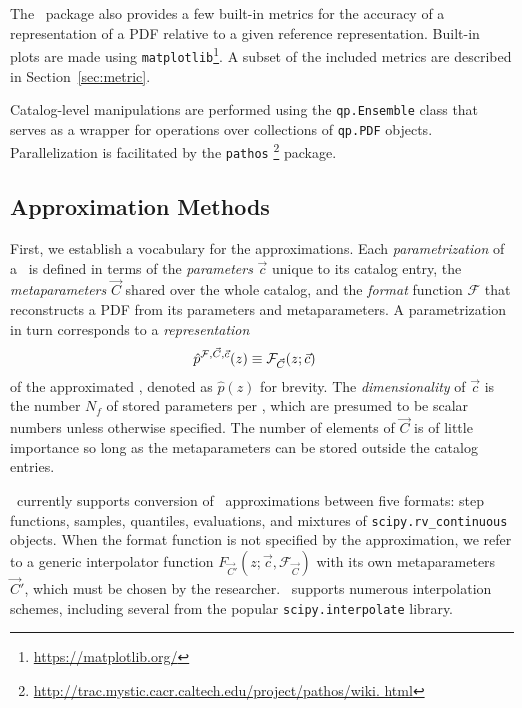 The \qp\ package also provides a few built-in metrics for the accuracy of a 
representation of a PDF relative to a given reference representation.
Built-in plots are made using 
\texttt{matplotlib}\footnote{\url{https://matplotlib.org/}}.
A subset of the included metrics are described in Section~\ref{sec:metric}.

Catalog-level manipulations are performed using the \texttt{qp.Ensemble} class 
that serves as a wrapper for operations over collections of \texttt{qp.PDF} 
objects.
Parallelization is facilitated by the \texttt{pathos} 
\footnote{\noindent\url{http://trac.mystic.cacr.caltech.edu/project/pathos/wiki.
		html}} \citep{mckerns_building_2012, mckerns_pathos:_2010} package.

\subsection{Approximation Methods}

First, we establish a vocabulary for the approximations.
Each \textit{parametrization} of a \pz\ is defined in terms of the 
\textit{parameters} $\vec{c}$ unique to its catalog entry, the 
\textit{metaparameters} $\vec{C}$ shared over the whole catalog, and the 
\textit{format} function $\mathcal{F}$ that reconstructs a PDF from its 
parameters and metaparameters.
A parametrization in turn corresponds to a \textit{representation}
\begin{align}
\eqlabel{eq:definition}
\hat{p}^{\mathcal{F}, \vec{C}, \vec{c}}(z) &\equiv \mathcal{F}_{\vec{C}}(z; 
\vec{c})
\end{align}
of the approximated \pz, denoted as $\hat{p}(z)$ for brevity.
The \textit{dimensionality} of $\vec{c}$ is the number $N_{f}$ of stored 
parameters per \pz, which are presumed to be scalar numbers unless otherwise 
specified.
The number of elements of $\vec{C}$ is of little importance so long as the 
metaparameters can be stored outside the catalog entries.

\qp\ currently supports conversion of \pz\ approximations between five formats: 
step functions, samples, quantiles, evaluations, and mixtures of 
\texttt{scipy.rv\_continuous} objects.
When the format function is not specified by the approximation, we refer to a 
generic interpolator function $F_{\vec{C}'}(z; \vec{c}, \mathcal{F}_{\vec{C}})$ 
with its own metaparameters $\vec{C}'$, which must be chosen by the researcher.
\qp\ supports numerous interpolation schemes, including several from the 
popular \texttt{scipy.interpolate} library.

